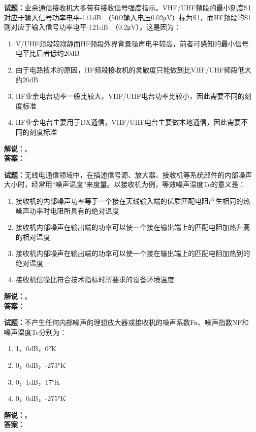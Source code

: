 \documentclass{ctexbook}
\begin{document}
\noindent\textbf{试题：}业余通信接收机大多带有接收信号强度指示。VHF/UHF频段的最小刻度S1对应于输入信号功率电平-141\unit[qualifier-mode=combine]{\deci\bel{}}（50Ω输入电压0.02μV）标为S1，而HF频段的S1则对应于输入信号功率电平-121\unit[qualifier-mode=combine]{\deci\bel{}}（0.2μV）。这是因为：
\begin{enumerate}[leftmargin=3em]
\item V/UHF频段较寂静而HF频段外界背景噪声电平较高，前者可感知的最小信号电平比后者低约20dB
\item 由于电路技术的原因，HF频段接收机的灵敏度只能做到比VHF/UHF频段低大约20dB
\item HF业余电台功率一般比较大，VHF/UHF电台功率比较小，因此需要不同的刻度标准
\item HF业余电台主要用于DX通信，VHF/UHF电台主要做本地通信，因此需要不同的刻度标准
\end{enumerate}
\noindent\textbf{解说：}\textbf{}。\\\noindent\textbf{答案：}

\bigskip




\noindent\textbf{试题：}无线电通信领域中，在描述信号源、放大器、接收机等系统部件的内部噪声大小时，经常用“噪声温度”来度量。以接收机为例，等效噪声温度Te的意义是：
\begin{enumerate}[leftmargin=3em]
\item 接收机的内部噪声功率等于一个接在天线输入端的优质匹配电阻产生相同的热噪声功率时电阻所具有的绝对温度
\item 接收机内部噪声在输出端的功率可以使一个接在输出端上的匹配电阻加热升高的相对温度
\item 接收机内部噪声在输出端的功率可以使一个接在输出端上的匹配电阻加热到的绝对温度
\item 接收机信噪比符合技术指标时所要求的设备环境温度
\end{enumerate}
\noindent\textbf{解说：}\textbf{}。\\\noindent\textbf{答案：}

\bigskip




\noindent\textbf{试题：}不产生任何内部噪声的理想放大器或接收机的噪声系数Fn、噪声指数NF和噪声温度Te分别为：
\begin{enumerate}[leftmargin=3em]
\item 1，0dB，0°K
\item 0，0dB，-273°K
\item 0，1dB，17°K
\item 0，0dB，-275°K
\end{enumerate}
\noindent\textbf{解说：}\textbf{}。\\\noindent\textbf{答案：}
\end{document}
